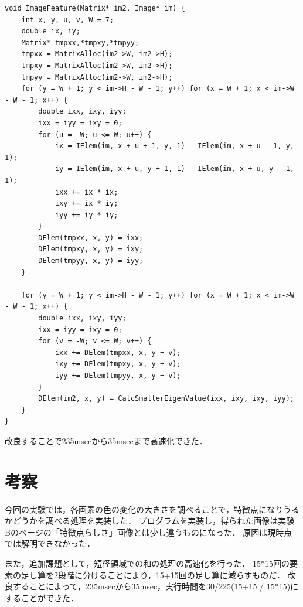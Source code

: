 \documentclass[11pt]{jarticle}
\begin{document}
\begin{lstlisting}
void ImageFeature(Matrix* im2, Image* im) {
    int x, y, u, v, W = 7;
    double ix, iy;
    Matrix* tmpxx,*tmpxy,*tmpyy;
    tmpxx = MatrixAlloc(im2->W, im2->H);
    tmpxy = MatrixAlloc(im2->W, im2->H);
    tmpyy = MatrixAlloc(im2->W, im2->H);
    for (y = W + 1; y < im->H - W - 1; y++) for (x = W + 1; x < im->W - W - 1; x++) {
        double ixx, ixy, iyy;
        ixx = iyy = ixy = 0;
        for (u = -W; u <= W; u++) {
            ix = IElem(im, x + u + 1, y, 1) - IElem(im, x + u - 1, y, 1);
            iy = IElem(im, x + u, y + 1, 1) - IElem(im, x + u, y - 1, 1);
            ixx += ix * ix;
            ixy += ix * iy;
            iyy += iy * iy;
        }
        DElem(tmpxx, x, y) = ixx;
        DElem(tmpxy, x, y) = ixy;
        DElem(tmpyy, x, y) = iyy;
    }

    for (y = W + 1; y < im->H - W - 1; y++) for (x = W + 1; x < im->W - W - 1; x++) {
        double ixx, ixy, iyy;
        ixx = iyy = ixy = 0;
        for (v = -W; v <= W; v++) {
            ixx += DElem(tmpxx, x, y + v);
            ixy += DElem(tmpxy, x, y + v);
            iyy += DElem(tmpyy, x, y + v);
        }
        DElem(im2, x, y) = CalcSmallerEigenValue(ixx, ixy, ixy, iyy);
    }
}
\end{lstlisting}

改良することで235msecから35msecまで高速化できた．

\section{考察}

今回の実験では，各画素の色の変化の大きさを調べることで，特徴点になりうるかどうかを調べる処理を実装した．
プログラムを実装し，得られた画像は実験Bのページの「特徴点らしさ」画像とは少し違うものになった．
原因は現時点では解明できなかった．

また，追加課題として，短径領域での和の処理の高速化を行った．
15*15回の要素の足し算を2段階に分けることにより，15+15回の足し算に減らすものだ．
改良することによって，235msecから35msec，実行時間を30/225(15+15 / 15*15)にすることができた．
\end{document}
